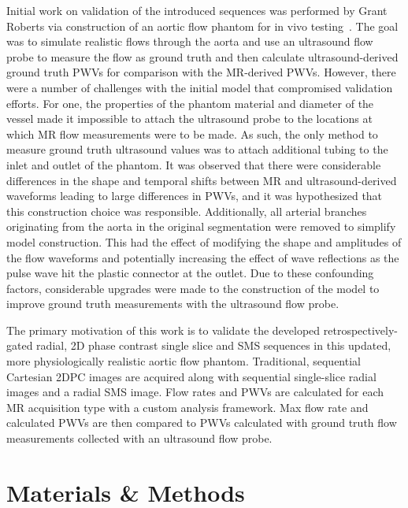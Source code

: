 Initial work on validation of the introduced sequences was performed by Grant Roberts via construction of an aortic flow phantom for in vivo testing~\cite{robertsAdvancingFunctionalAssessment2023}. The goal was to simulate realistic flows through the aorta and use an ultrasound flow probe to measure the flow as ground truth and then calculate ultrasound-derived ground truth PWVs for comparison with the MR-derived PWVs. However, there were a number of challenges with the initial model that compromised validation efforts. For one, the properties of the phantom material and diameter of the vessel made it impossible to attach the ultrasound probe to the locations at which MR flow measurements were to be made. As such, the only method to measure ground truth ultrasound values was to attach additional tubing to the inlet and outlet of the phantom. It was observed that there were considerable differences in the shape and temporal shifts between MR and ultrasound-derived waveforms leading to large differences in PWVs, and it was hypothesized that this construction choice was responsible. Additionally, all arterial branches originating from the aorta in the original segmentation were removed to simplify model construction. This had the effect of modifying the shape and amplitudes of the flow waveforms and potentially increasing the effect of wave reflections as the pulse wave hit the plastic connector at the outlet. Due to these confounding factors, considerable upgrades were made to the construction of the model to improve ground truth measurements with the ultrasound flow probe.

The primary motivation of this work is to validate the developed retrospectively-gated radial, 2D phase contrast single slice and SMS sequences in this updated, more physiologically realistic aortic flow phantom. Traditional, sequential Cartesian 2DPC images are acquired along with sequential single-slice radial images and a radial SMS image. Flow rates and PWVs are calculated for each MR acquisition type with a custom analysis framework. Max flow rate and calculated PWVs are then compared to PWVs calculated with ground truth flow measurements collected with an ultrasound flow probe. 

\section{Materials \& Methods}\label{sec:phantom_methods}
